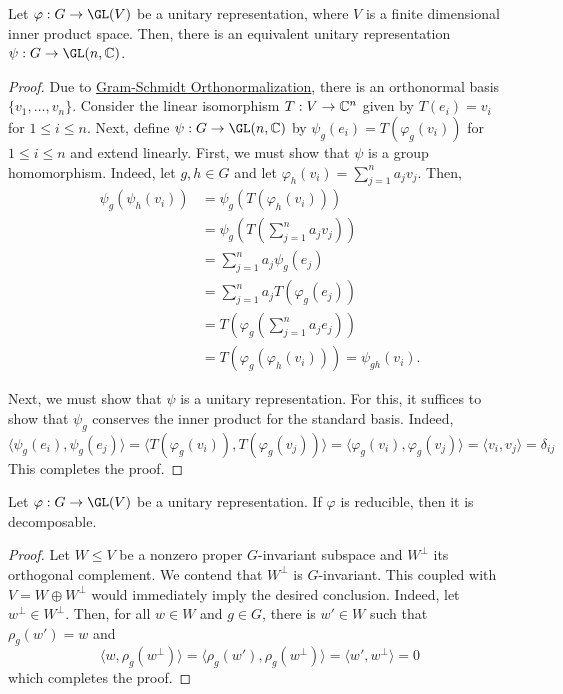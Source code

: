 \begin{proposition}
    Let $\varphi: G\to\GL(V)$ be a unitary representation, where $V$ is a finite dimensional inner product space. Then, there is an equivalent unitary representation $\psi: G\to\GL(n,\bbC)$.
\end{proposition}
\begin{proof}
    Due to \underline{Gram-Schmidt Orthonormalization}, there is an orthonormal basis $\{v_1,\ldots,v_n\}$. Consider the linear isomorphism $T: V\to\mathbb{C}^n$ given by $T(e_i) = v_i$ for $1\le i\le n$. Next, define $\psi: G\to\GL(n,\bbC)$ by $\psi_g(e_i) = T(\varphi_g(v_i))$ for $1\le i\le n$ and extend linearly. First, we must show that $\psi$ is a group homomorphism. Indeed, let $g,h\in G$ and let $\varphi_h(v_i) = \sum_{j = 1}^n a_jv_j$. Then, 
    \begin{align*}
        \psi_g(\psi_h(v_i)) &= \psi_g(T(\varphi_h(v_i)))\\
        &= \psi_g\left(T\left(\sum_{j = 1}^na_jv_j\right)\right)\\
        &= \sum_{j = 1}^na_j\psi_g(e_j)\\
        &= \sum_{j = 1}^na_jT(\varphi_g(e_j))\\
        &= T\left(\varphi_g\left(\sum_{j = 1}^n a_je_j\right)\right)\\
        &= T(\varphi_g(\varphi_h(v_i))) = \psi_{gh}(v_i).
    \end{align*}

    Next, we must show that $\psi$ is a unitary representation. For this, it suffices to show that $\psi_g$ conserves the inner product for the standard basis. Indeed, 
    \begin{equation*}
        \langle\psi_g(e_i),\psi_g(e_j)\rangle = \langle T(\varphi_g(v_i)), T(\varphi_g(v_j))\rangle = \langle\varphi_g(v_i),\varphi_g(v_j)\rangle = \langle v_i, v_j\rangle = \delta_{ij}
    \end{equation*}
    This completes the proof.
\end{proof}

\begin{lemma}
    Let $\varphi: G\to\GL(V)$ be a unitary representation. If $\varphi$ is reducible, then it is decomposable.
\end{lemma}
\begin{proof}
    Let $W\le V$ be a nonzero proper $G$-invariant subspace and $W^\perp$ its orthogonal complement. We contend that $W^\perp$ is $G$-invariant. This coupled with $V = W\oplus W^\perp$ would immediately imply the desired conclusion. Indeed, let $w^\perp\in W^\perp$. Then, for all $w\in W$ and $g\in G$, there is $w'\in W$ such that $\rho_g(w') = w$ and 
    \begin{equation*}
        \langle w,\rho_g(w^\perp)\rangle = \langle\rho_g(w'),\rho_g(w^\perp)\rangle = \langle w', w^\perp\rangle = 0
    \end{equation*}
    which completes the proof.
\end{proof}

